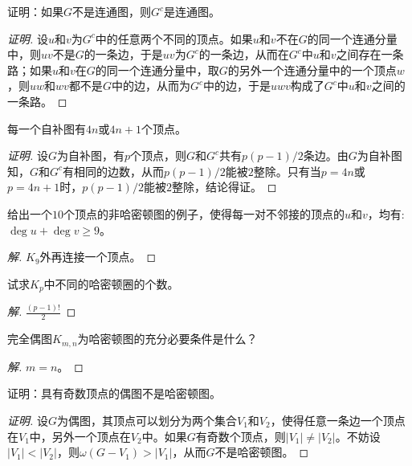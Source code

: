 \documentclass{article}
\begin{document}
\begin{CJK}{UTF8}{gbsn}
\begin{Exercise}
  证明：如果$G$不是连通图，则$G^c$是连通图。
\end{Exercise}
\begin{proof}[证明]
  设$u$和$v$为$G^c$中的任意两个不同的顶点。如果$u$和$v$不在$G$的同一个连通分量中，则$uv$不是$G$的一条边，于是$uv$为$G^c$的一条边，从而在$G^c$中$u$和$v$之间存在一条路；如果$u$和$v$在$G$的同一个连通分量中，取$G$的另外一个连通分量中的一个顶点$w$，则$uw$和$wv$都不是$G$中的边，从而为$G^c$中的边，于是$uwv$构成了$G^c$中$u$和$v$之间的一条路。
\end{proof}
\begin{Exercise}
  每一个自补图有$4n$或$4n+1$个顶点。
\end{Exercise}
\begin{proof}[证明]
  设$G$为自补图，有$p$个顶点，则$G$和$G^c$共有$p(p-1)/2$条边。由$G$为自补图知，$G$和$G^c$有相同的边数，从而$p(p-1)/2$能被$2$整除。只有当$p=4n$或$p=4n+1$时，$p(p-1)/2$能被$2$整除，结论得证。
\end{proof}
\begin{Exercise}
  给出一个$10$个顶点的非哈密顿图的例子，使得每一对不邻接的顶点的$u$和$v$，均有:$\deg u + \deg v \geq 9$。
\end{Exercise}
\begin{proof}[解]
  $K_9$外再连接一个顶点。
\end{proof}
\begin{Exercise}
  试求$K_p$中不同的哈密顿圈的个数。
\end{Exercise}
\begin{proof}[解]
  $\frac{(p-1)!}{2}$
\end{proof}
\begin{Exercise}
  完全偶图$K_{m,n}$为哈密顿图的充分必要条件是什么？
\end{Exercise}
\begin{proof}[解]
  $m=n$。
\end{proof}
\begin{Exercise}
  证明：具有奇数顶点的偶图不是哈密顿图。
\end{Exercise}
\begin{proof}[证明]
  设$G$为偶图，其顶点可以划分为两个集合$V_1$和$V_2$，使得任意一条边一个顶点在$V_1$中，另外一个顶点在$V_2$中。如果$G$有奇数个顶点，则$|V_1|\neq |V_2|$。不妨设$|V_1| < |V_2|$，则$\omega (G-V_1) > |V_1|$，从而$G$不是哈密顿图。
\end{proof}

\end{CJK}
\end{document}
